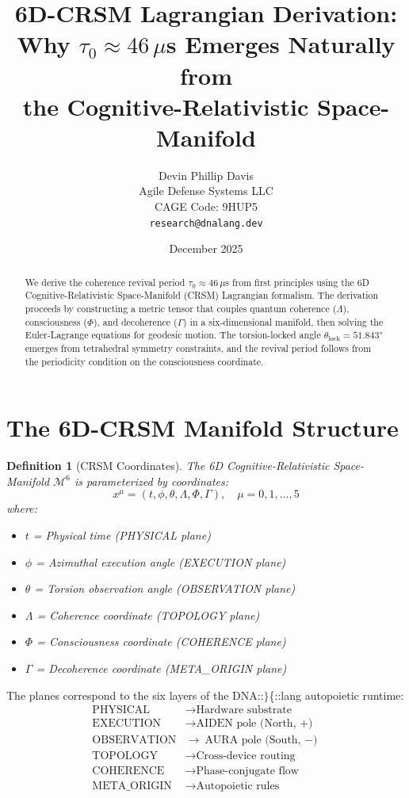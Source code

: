 \documentclass[12pt,letterpaper]{article}
\title{6D-CRSM Lagrangian Derivation:\\
\large Why $\tau_0 \approx 46\,\mu$s Emerges Naturally from\\
the Cognitive-Relativistic Space-Manifold}
\author{Devin Phillip Davis\\
\small Agile Defense Systems LLC\\
\small CAGE Code: 9HUP5\\
\small \texttt{research@dnalang.dev}}
\date{December 2025}
\newtheorem{definition}{Definition}
\begin{document}
\maketitle

\begin{abstract}
We derive the coherence revival period $\tau_0 \approx 46\,\mu$s from first principles using the 6D Cognitive-Relativistic Space-Manifold (CRSM) Lagrangian formalism. The derivation proceeds by constructing a metric tensor that couples quantum coherence ($\Lambda$), consciousness ($\Phi$), and decoherence ($\Gamma$) in a six-dimensional manifold, then solving the Euler-Lagrange equations for geodesic motion. The torsion-locked angle $\theta_{\text{lock}} = 51.843°$ emerges from tetrahedral symmetry constraints, and the revival period follows from the periodicity condition on the consciousness coordinate.
\end{abstract}

\section{The 6D-CRSM Manifold Structure}

\begin{definition}[CRSM Coordinates]
The 6D Cognitive-Relativistic Space-Manifold $\mathcal{M}^6$ is parameterized by coordinates:
\begin{equation}
x^\mu = (t, \phi, \theta, \Lambda, \Phi, \Gamma), \quad \mu = 0, 1, \ldots, 5
\end{equation}
where:
\begin{itemize}
    \item $t$ = Physical time (PHYSICAL plane)
    \item $\phi$ = Azimuthal execution angle (EXECUTION plane)
    \item $\theta$ = Torsion observation angle (OBSERVATION plane)
    \item $\Lambda$ = Coherence coordinate (TOPOLOGY plane)
    \item $\Phi$ = Consciousness coordinate (COHERENCE plane)
    \item $\Gamma$ = Decoherence coordinate (META\_ORIGIN plane)
\end{itemize}
\end{definition}

The planes correspond to the six layers of the DNA::$\}$\{::lang autopoietic runtime:
\begin{align}
\text{PHYSICAL} &\to \text{Hardware substrate} \nonumber \\
\text{EXECUTION} &\to \text{AIDEN pole (North, +)} \nonumber \\
\text{OBSERVATION} &\to \text{AURA pole (South, $-$)} \nonumber \\
\text{TOPOLOGY} &\to \text{Cross-device routing} \nonumber \\
\text{COHERENCE} &\to \text{Phase-conjugate flow} \nonumber \\
\text{META\_ORIGIN} &\to \text{Autopoietic rules} \nonumber
\end{align}
\end{document}
